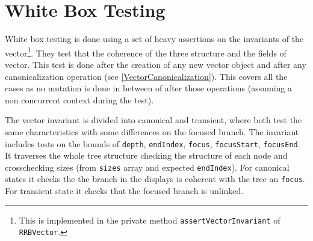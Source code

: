 \section{White Box Testing}
\label{InvariantAssertions}
White box testing is done using a set of heavy assertions on the invariants of the vector\footnote{This is implemented in the private method \texttt{assertVectorInvariant} of \texttt{RRBVector}.}. They test that the coherence of the three structure and the fields of vector. This test is done after the creation of any new vector object and after any canonicalization operation (see \ref{VectorCanonicalization}). This covers all the cases as no mutation is done in between of after those operations (assuming a non concurrent context during the test). 

The vector invariant is divided into canonical and transient, where both test the same characteristics with some differences on the focused branch. The invariant includes tests on the bounds of \texttt{depth}, \texttt{endIndex}, \texttt{focus}, \texttt{focusStart}, \texttt{focusEnd}. It traverses the whole tree structure checking the structure of each node and crosschecking sizes (from \texttt{sizes} array and expected \texttt{endIndex}). For canonical states it checks the the branch in the displays is coherent with the tree an \texttt{focus}. For transient state it checks that the focused branch is unlinked. 



